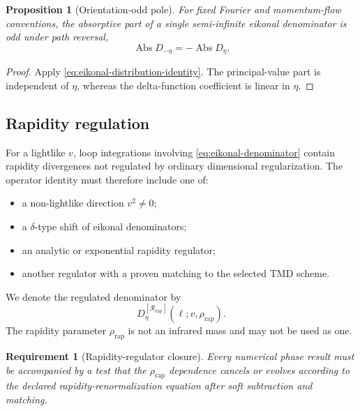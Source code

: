 \documentclass[11pt]{article}
\newtheorem{requirement}[definition]{Requirement}
\newtheorem{proposition}[definition]{Proposition}
\newcommand{\cR}{\mathcal R}
\newcommand{\rap}{\mathrm{rap}}
\begin{document}
\begin{proposition}[Orientation-odd pole]
\label{prop:orientation-odd-pole}
For fixed Fourier and momentum-flow conventions, the absorptive part of a
single semi-infinite eikonal denominator is odd under path reversal,
\begin{equation}
 \operatorname{Abs}D_{-\eta}=-\operatorname{Abs}D_\eta.
\label{eq:orientation-odd-pole-result}
\end{equation}
\end{proposition}

\begin{proof}
Apply \cref{eq:eikonal-distribution-identity}.  The principal-value part is
independent of \(\eta\), whereas the delta-function coefficient is linear in
\(\eta\).
\end{proof}

\subsection{Rapidity regulation}

For a lightlike \(v\), loop integrations involving \cref{eq:eikonal-denominator}
contain rapidity divergences not regulated by ordinary dimensional
regularization.  The operator identity must therefore include one of:
\begin{itemize}
\item a non-lightlike direction \(v^2\neq0\);
\item a \(\delta\)-type shift of eikonal denominators;
\item an analytic or exponential rapidity regulator;
\item another regulator with a proven matching to the selected TMD scheme.
\end{itemize}
We denote the regulated denominator by
\begin{equation}
 D_{\eta}^{[\cR_{\rap}]}(\ell;v,\rho_{\rap}).
\label{eq:regulated-eikonal-denominator}
\end{equation}
The rapidity parameter \(\rho_{\rap}\) is not an infrared mass and may not be
used as one.

\begin{requirement}[Rapidity-regulator closure]
\label{req:rapidity-regulator-closure}
Every numerical phase result must be accompanied by a test that the
\(\rho_{\rap}\) dependence cancels or evolves according to the declared
rapidity-renormalization equation after soft subtraction and matching.
\end{requirement}
\end{document}
